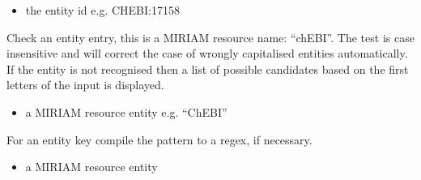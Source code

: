 \documentclass[letterpaper,10pt,english]{sphinxmanual}
\begin{document}
\begin{fulllineitems}
\begin{fulllineitems}
\begin{itemize}
\item {} 
\sphinxAtStartPar
{} the entity id e.g. CHEBI:17158

\end{itemize}

\end{fulllineitems}


\begin{fulllineitems}
\label{\detokenize{modules_doc:cbmpy.CBCommon.MIRIAMannotation.checkEntity}}
\pysigstartsignatures
{}
\pysigstopsignatures
\sphinxAtStartPar
Check an entity entry, this is a MIRIAM resource name: “chEBI”. The test is case insensitive and will correct the case
of wrongly capitalised entities automatically. If the entity is not recognised then a list of possible candidates
based on the first letters of the input is displayed.
\begin{itemize}
\item {} 
\sphinxAtStartPar
{} a MIRIAM resource entity e.g. “ChEBI”

\end{itemize}

\end{fulllineitems}


\begin{fulllineitems}
\label{\detokenize{modules_doc:cbmpy.CBCommon.MIRIAMannotation.checkEntityPattern}}
\pysigstartsignatures
{}
\pysigstopsignatures
\sphinxAtStartPar
For an entity key compile the pattern to a regex, if necessary.
\begin{itemize}
\item {} 
\sphinxAtStartPar
{} a MIRIAM resource entity

\end{itemize}

\end{fulllineitems}



\end{fulllineitems}
\end{document}
